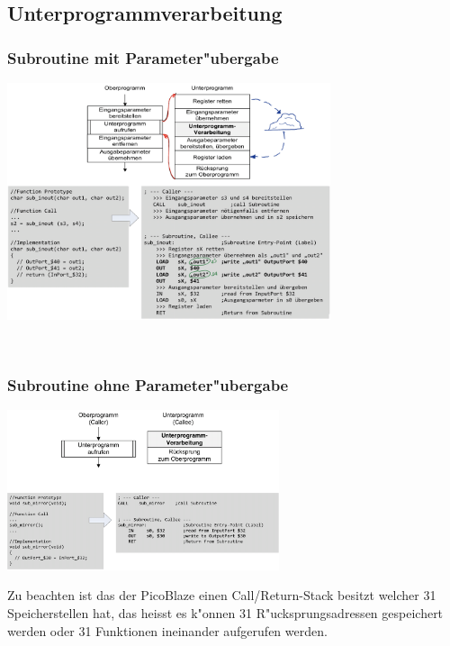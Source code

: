 \subsection{Unterprogrammverarbeitung}
\begin{minipage}{10cm}
	\subsubsection{Subroutine mit Parameter"ubergabe}
	\includegraphics[width = 9.5cm]{pics/Subroutine_Mit_Parameter}
\end{minipage}
%
\begin{minipage}{0.5cm}
	\ \
\end{minipage}
%
\begin{minipage}{8cm}
	\subsubsection{Subroutine ohne Parameter"ubergabe}
	\includegraphics[width = 8cm]{pics/Subroutine_ohne_Parameter}
	
	Zu beachten ist das der PicoBlaze einen Call/Return-Stack besitzt welcher 31 Speicherstellen hat, das heisst es k"onnen 31 R"ucksprungsadressen gespeichert werden oder 31 Funktionen ineinander aufgerufen werden.
\end{minipage}

